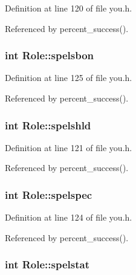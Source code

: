 Definition at line 120 of file you.\+h.



Referenced by percent\+\_\+success().

\hypertarget{structRole_ab004ef3778c833bcf4d40e36a4a242ce}{
\subsubsection[{spelsbon}]{\setlength{\rightskip}{0pt plus 5cm}int Role\+::spelsbon}}\label{structRole_ab004ef3778c833bcf4d40e36a4a242ce}


Definition at line 125 of file you.\+h.



Referenced by percent\+\_\+success().

\hypertarget{structRole_a57bc24c9f9dfe0307edbeaa06f5e444d}{
\subsubsection[{spelshld}]{\setlength{\rightskip}{0pt plus 5cm}int Role\+::spelshld}}\label{structRole_a57bc24c9f9dfe0307edbeaa06f5e444d}


Definition at line 121 of file you.\+h.



Referenced by percent\+\_\+success().

\hypertarget{structRole_a35fdcf893188c27f4bcdb4c13d408261}{
\subsubsection[{spelspec}]{\setlength{\rightskip}{0pt plus 5cm}int Role\+::spelspec}}\label{structRole_a35fdcf893188c27f4bcdb4c13d408261}


Definition at line 124 of file you.\+h.



Referenced by percent\+\_\+success().

\hypertarget{structRole_a2734f2aade75628f8d606ed389491522}{
\subsubsection[{spelstat}]{\setlength{\rightskip}{0pt plus 5cm}int Role\+::spelstat}}\label{structRole_a2734f2aade75628f8d606ed389491522}


